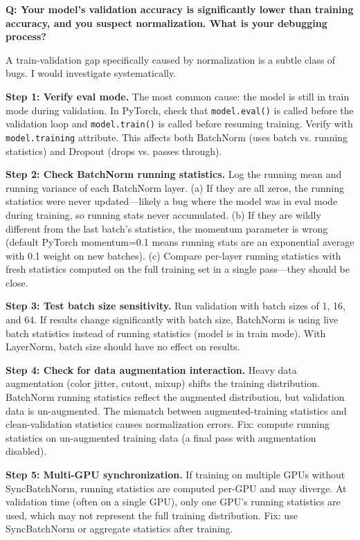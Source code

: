 \begin{interviewq}
\textbf{Q: Your model's validation accuracy is significantly lower than training accuracy, and you suspect normalization. What is your debugging process?}

 \quad {} \quad \badgefreq{\freqmed}

\stronganswer

A train-validation gap specifically caused by normalization is a subtle class of bugs. I would investigate systematically.

\textbf{Step 1: Verify eval mode.} The most common cause: the model is still in train mode during validation. In PyTorch, check that \texttt{model.eval()} is called before the validation loop and \texttt{model.train()} is called before resuming training. Verify with \texttt{model.training} attribute. This affects both BatchNorm (uses batch vs. running statistics) and Dropout (drops vs. passes through).

\textbf{Step 2: Check BatchNorm running statistics.} Log the running mean and running variance of each BatchNorm layer. (a) If they are all zeros, the running statistics were never updated---likely a bug where the model was in eval mode during training, so running stats never accumulated. (b) If they are wildly different from the last batch's statistics, the momentum parameter is wrong (default PyTorch momentum=0.1 means running stats are an exponential average with 0.1 weight on new batches). (c) Compare per-layer running statistics with fresh statistics computed on the full training set in a single pass---they should be close.

\textbf{Step 3: Test batch size sensitivity.} Run validation with batch sizes of 1, 16, and 64. If results change significantly with batch size, BatchNorm is using live batch statistics instead of running statistics (model is in train mode). With LayerNorm, batch size should have no effect on results.

\textbf{Step 4: Check for data augmentation interaction.} Heavy data augmentation (color jitter, cutout, mixup) shifts the training distribution. BatchNorm running statistics reflect the augmented distribution, but validation data is un-augmented. The mismatch between augmented-training statistics and clean-validation statistics causes normalization errors. Fix: compute running statistics on un-augmented training data (a final pass with augmentation disabled).

\textbf{Step 5: Multi-GPU synchronization.} If training on multiple GPUs without SyncBatchNorm, running statistics are computed per-GPU and may diverge. At validation time (often on a single GPU), only one GPU's running statistics are used, which may not represent the full training distribution. Fix: use SyncBatchNorm or aggregate statistics after training.


\end{interviewq}
